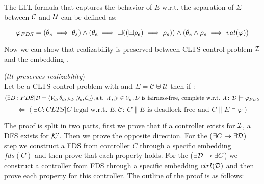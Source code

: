 The LTL formula that captures the behavior of $E$ w.r.t. the separation of $\Sigma$ between $\mathcal{C}$ and $\mathcal{U}$ can be defined as:

\[ \varphi_{FDS} = (\theta_e \implies \theta_s) \wedge (\theta_e \implies \square((\boxdot \rho_e) \implies \rho_s)) \wedge (\theta_e \wedge \rho_e \implies val(\varphi)) \]

Now we can show that realizability is preserved between CLTS control problem $\mathcal{I}$ and the embedding \fdsEmbedding.

\begin{theorem}(\emph{$ltl$ preserves realizability})\label{theorem:gs_preserves_realizability}\\
	Let \controlProblemDef be a CLTS control problem with  and $\Sigma = \mathcal{C}\uplus \mathcal{U}$ then if \fdsEmbedding:
	\small
	\[(\exists D:FDS|\mathcal{D}= \langle \mathcal{V}_d, \theta_d, \rho_d, \mathcal{J}_d, \mathcal{C}_d\rangle, \text{s.t. }    {\mathcal{X}}, {\mathcal{Y}} \in \mathcal{V}_d, D \text{ is fairness-free, complete w.r.t. } {\mathcal{X}} \text{: } \mathcal{D} \models \varphi_{FDS}\]
	 \[ \iff (\exists C:CLTS| C \text{ legal w.r.t. } E,\mathcal{C} \text{: } C \parallel E \text{ is deadlock-free and } C \parallel E \models \varphi)  \]
	\normalsize
\end{theorem}


The proof is split in two parts, first we prove that if a controller exists for $\mathcal{I}$, a DFS exists for ${\mathcal{K}}'$. Then we prove the opposite direction. For the ($\exists C \rightarrow \exists \mathcal{D}$) step we construct a FDS from controller $C$ through a specific embedding $fds(C)$ and then prove that each property holds. For the ($\exists \mathcal{D} \rightarrow \exists C$) we construct a controller from FDS \fdsD through a specific embedding $ctrl(\mathcal{D})$ and then prove each property for this controller. The outline of the proof is as follows:

